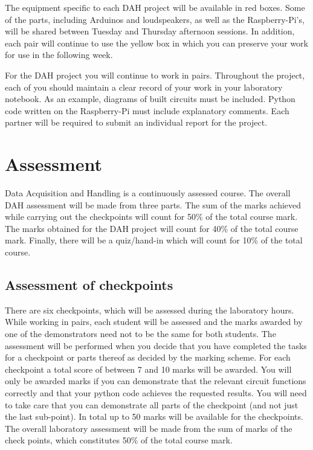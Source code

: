 The equipment specific to each DAH project will be available in red boxes. Some of the parts, including Arduinos and loudspeakers, as well as the Raspberry-Pi's, will be shared between Tuesday and Thursday afternoon sessions. In addition, each pair will continue to use the yellow box in which you can preserve your work for use in the following week. 

For the DAH project you will continue to work in pairs. Throughout the project, each of you should maintain a clear record of your work in your laboratory notebook. As an example, diagrams of built circuits must be included. Python code written on the Raspberry-Pi must include explanatory comments.  Each partner will be required to submit an individual report for the project. 
\vfill
\newpage

\section{Assessment} 

Data Acquisition and Handling is a continuously assessed course. The overall DAH  assessment will be made from three parts. The sum of the marks achieved while carrying out the checkpoints will count for 50\% of the total course mark.  The marks obtained for the DAH project will count for 40\% of the total course mark. Finally, there will be a quiz/hand-in which will count for 10\% of the total course.

\subsection{Assessment of checkpoints}

There are six checkpoints, which will be assessed during the laboratory hours. While working in pairs, each student will be assessed and the marks awarded by one of the demonstrators
need not to be the same for both students.
The assessment will be performed when you decide that you have completed the tasks for a checkpoint or parts thereof as decided by the marking scheme. For each checkpoint a total score of between 7 and 10 marks will be awarded. You will only be awarded marks if you can demonstrate that the relevant circuit functions correctly and that your python code achieves the requested results. 
You will need to take care that you can demonstrate all parts of the checkpoint (and not just the last sub-point). In total up to 50 marks will be available for the checkpoints. 
The overall laboratory assessment will be made from the sum of marks of the check points, which constitutes 50\% of the total course mark.


